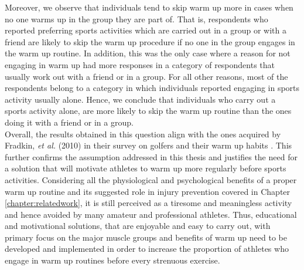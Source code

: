 Moreover, we observe that individuals tend to skip warm up more in cases when no one warms up in the group they are part of. That is, respondents who reported preferring sports activities which are carried out in a group or with a friend are likely to skip the warm up procedure if no one in the group engages in the warm up routine. In addition, this was the only case where a reason for not engaging in warm up had more responses in a category of respondents that usually work out with a friend or in a group. For all other reasons, most of the respondents belong to a category in which individuals reported engaging in sports activity usually alone. Hence, we conclude that individuals who carry out a sports activity alone, are more likely to skip the warm up routine than the ones doing it with a friend or in a group.\\ Overall, the results obtained in this question align with the ones acquired by Fradkin, \textit{et al.} (2010) in their survey on golfers and their warm up habits \cite{fradkin2010effects}. This further confirms the assumption addressed in this thesis and justifies the need for a solution that will motivate athletes to warm up more regularly before sports activities. Considering all the physiological and psychological benefits of a proper warm up routine and its suggested role in injury prevention covered in Chapter  \ref{chapter:relatedwork}, it is still perceived as a tiresome and meaningless activity and hence avoided by many amateur and professional athletes. Thus, educational and motivational solutions, that are enjoyable and easy to carry out, with primary focus on the major muscle groups and benefits of warm up need to be developed and implemented in order to increase the proportion of athletes who engage in warm up routines before every strenuous exercise.\\

